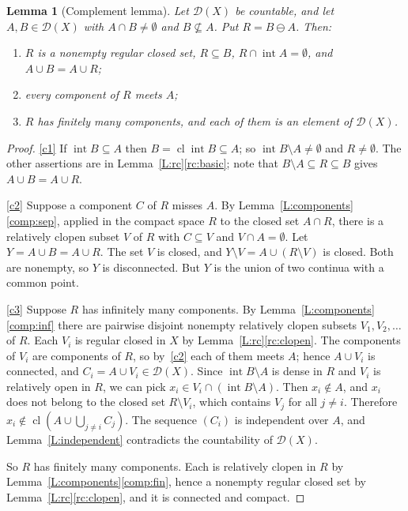 \documentclass[11pt,reqno]{amsart}
\theoremstyle{plain}
\newtheorem{lemma}[theorem]{Lemma}
\theoremstyle{definition}
\theoremstyle{remark}
\newcommand{\D}{\mathcal{D}}
\newcommand{\cl}{\operatorname{cl}}
\newcommand{\intr}{\operatorname{int}}
\newcommand{\rd}{\ominus}
\begin{document}
\begin{lemma}[Complement lemma]\label{L:complement}
Let $\D(X)$ be countable, and let $A,B\in\D(X)$ with $A\cap B\neq\emptyset$ and $B\not\subseteq A$. Put $R=B\rd A$. Then:
\begin{enumerate}[label=\textup{(\arabic*)}]
\item\label{c1} $R$ is a nonempty regular closed set, $R\subseteq B$, $R\cap\intr A=\emptyset$, and $A\cup B=A\cup R$;
\item\label{c2} every component of $R$ meets $A$;
\item\label{c3} $R$ has finitely many components, and each of them is an element of $\D(X)$.
\end{enumerate}
\end{lemma}

\begin{proof}
\ref{c1} If $\intr B\subseteq A$ then $B=\cl\intr B\subseteq A$; so $\intr B\setminus A\neq\emptyset$ and $R\neq\emptyset$. The other assertions are in Lemma~\ref{L:rc}\ref{rc:basic}; note that $B\setminus A\subseteq R\subseteq B$ gives $A\cup B=A\cup R$.

\ref{c2} Suppose a component $C$ of $R$ misses $A$. By Lemma~\ref{L:components}\ref{comp:sep}, applied in the compact space $R$ to the closed set $A\cap R$, there is a relatively clopen subset $V$ of $R$ with $C\subseteq V$ and $V\cap A=\emptyset$. Let $Y=A\cup B=A\cup R$. The set $V$ is closed, and $Y\setminus V=A\cup(R\setminus V)$ is closed. Both are nonempty, so $Y$ is disconnected. But $Y$ is the union of two continua with a common point.

\ref{c3} Suppose $R$ has infinitely many components. By Lemma~\ref{L:components}\ref{comp:inf} there are pairwise disjoint nonempty relatively clopen subsets $V_1,V_2,\dots$ of $R$. Each $V_i$ is regular closed in $X$ by Lemma~\ref{L:rc}\ref{rc:clopen}. The components of $V_i$ are components of $R$, so by~\ref{c2} each of them meets $A$; hence $A\cup V_i$ is connected, and $C_i=A\cup V_i\in\D(X)$. Since $\intr B\setminus A$ is dense in $R$ and $V_i$ is relatively open in $R$, we can pick $x_i\in V_i\cap(\intr B\setminus A)$. Then $x_i\notin A$, and $x_i$ does not belong to the closed set $R\setminus V_i$, which contains $V_j$ for all $j\neq i$. Therefore $x_i\notin\cl(A\cup\bigcup_{j\neq i}C_j)$. The sequence $(C_i)$ is independent over $A$, and Lemma~\ref{L:independent} contradicts the countability of $\D(X)$.

So $R$ has finitely many components. Each is relatively clopen in $R$ by Lemma~\ref{L:components}\ref{comp:fin}, hence a nonempty regular closed set by Lemma~\ref{L:rc}\ref{rc:clopen}, and it is connected and compact.
\end{proof}
\end{document}
